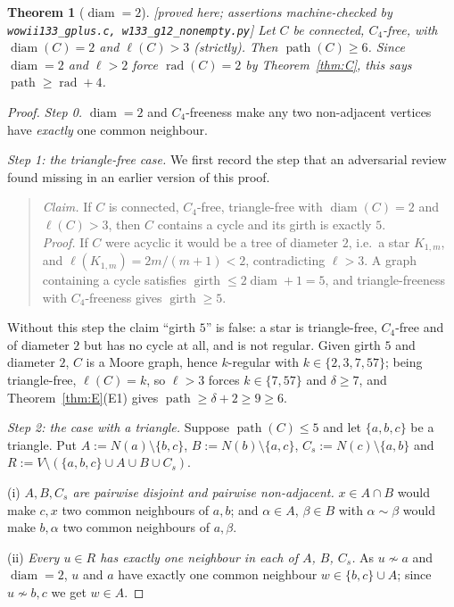 \documentclass[11pt]{article}
\theoremstyle{plain}
\newtheorem{theorem}{Theorem}[section]
\theoremstyle{definition}
\theoremstyle{remark}
\numberwithin{equation}{section}
\newcommand{\rad}{\operatorname{rad}}
\newcommand{\diam}{\operatorname{diam}}
\newcommand{\pth}{\operatorname{path}}
\newcommand{\gir}{\operatorname{girth}}
\newcommand{\statusbox}[1]{{\small\sloppy\textsf{[#1]}}}
\newcommand{\PRV}[1]{\statusbox{proved here; assertions machine-checked by \texttt{#1}}}
\begin{document}
\begin{theorem}[$\diam = 2$]\label{thm:g12}
\PRV{wowii133\_gplus.c, w133\_g12\_nonempty.py}
Let $C$ be connected, $C_4$-free, with $\diam(C) = 2$ and $\ell(C) > 3$ (strictly). Then
$\pth(C) \ge 6$. Since $\diam = 2$ and $\ell > 2$ force $\rad(C) = 2$ by
Theorem~\ref{thm:C}, this says $\pth \ge \rad + 4$.
\end{theorem}

\begin{proof}
\emph{Step 0.} $\diam = 2$ and $C_4$-freeness make any two non-adjacent vertices have
\emph{exactly} one common neighbour.

\emph{Step 1: the triangle-free case.} We first record the step that an adversarial review
found missing in an earlier version of this proof.

\begin{quote}
\emph{Claim.} If $C$ is connected, $C_4$-free, triangle-free with $\diam(C) = 2$ and
$\ell(C) > 3$, then $C$ contains a cycle and its girth is exactly $5$.\\
\emph{Proof.} If $C$ were acyclic it would be a tree of diameter $2$, i.e.\ a star
$K_{1,m}$, and $\ell(K_{1,m}) = 2m/(m+1) < 2$, contradicting $\ell > 3$. A graph containing a
cycle satisfies $\gir \le 2\diam + 1 = 5$, and triangle-freeness with $C_4$-freeness gives
$\gir \ge 5$.
\end{quote}

\noindent Without this step the claim ``girth $5$'' is false: a star is triangle-free,
$C_4$-free and of diameter $2$ but has no cycle at all, and is not regular. Given girth $5$
and diameter $2$, $C$ is a Moore graph, hence $k$-regular with $k \in \{2,3,7,57\}$; being
triangle-free, $\ell(C) = k$, so $\ell > 3$ forces $k \in \{7,57\}$ and $\delta \ge 7$, and
Theorem~\ref{thm:E}(E1) gives $\pth \ge \delta + 2 \ge 9 \ge 6$.

\emph{Step 2: the case with a triangle.} Suppose $\pth(C) \le 5$ and let $\{a,b,c\}$ be a
triangle. Put $A := N(a)\setminus\{b,c\}$, $B := N(b)\setminus\{a,c\}$,
$C_s := N(c)\setminus\{a,b\}$ and $R := V \setminus (\{a,b,c\}\cup A \cup B \cup C_s)$.

(i) \emph{$A, B, C_s$ are pairwise disjoint and pairwise non-adjacent.} $x \in A \cap B$
would make $c, x$ two common neighbours of $a,b$; and $\alpha \in A$, $\beta \in B$ with
$\alpha \sim \beta$ would make $b, \alpha$ two common neighbours of $a, \beta$.

(ii) \emph{Every $u \in R$ has exactly one neighbour in each of $A$, $B$, $C_s$.} As
$u \not\sim a$ and $\diam = 2$, $u$ and $a$ have exactly one common neighbour
$w \in \{b,c\} \cup A$; since $u \not\sim b,c$ we get $w \in A$.


\end{proof}
\end{document}
